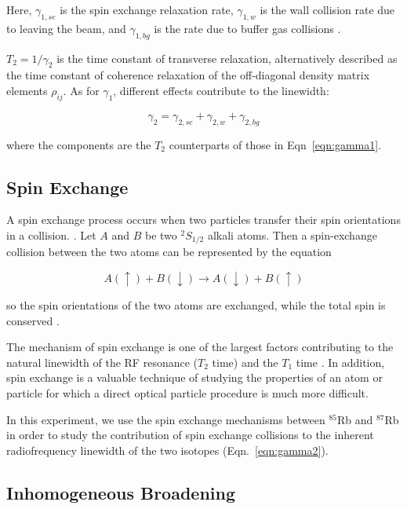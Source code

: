 Here, $\gamma_{1,se}$ is the spin exchange relaxation rate,
$\gamma_{1,w}$ is the wall collision rate due to leaving the beam, and
$\gamma_{1,bg}$ is the rate due to buffer gas collisions
\cite{vanier}.

$T_2 = 1/\gamma_2$ is the time constant of transverse relaxation,
alternatively described as the time constant of coherence relaxation
of the off-diagonal density matrix elements $\rho_{ij}$. As for $\gamma_1$, different effects contribute to the linewidth:

\begin{equation}
\gamma_2 = \gamma_{2,se} + \gamma_{2,w} + \gamma_{2,bg} 
\label{eqn:gamma2}
\end{equation} 
 
where the components are the $T_2$ counterparts of those in
Eqn~\ref{eqn:gamma1}.

\subsection{Spin Exchange}\label{spinexchange}

A spin exchange process occurs when two particles transfer their spin orientations in a collision. \cite{bernheim}. Let $A$ and $B$ be two $^2S_{1/2}$
alkali atoms. Then a spin-exchange collision between the two atoms
can be represented by the equation

\begin{equation}
A(\uparrow) + B(\downarrow) \rightarrow A(\downarrow) + B(\uparrow)
\end{equation}

so the spin orientations of the two atoms are exchanged, while the
total spin is conserved \cite{happer}.  

The mechanism of spin exchange is one of the largest factors
contributing to the natural linewidth of the RF resonance ($T_2$ time) and
the $T_1$ time \cite{vanier}. In addition, spin exchange is a valuable
technique of studying the properties of an atom or particle for which
a direct optical particle procedure is much more difficult.

In this experiment, we use the spin exchange mechanisms between
$^{85}$Rb and $^{87}$Rb in order to study the contribution of spin
exchange collisions to the inherent radiofrequency linewidth of the two isotopes
(Eqn.~\ref{eqn:gamma2}).

\subsection{Inhomogeneous Broadening}\label{inhomogeneousbroadening}

